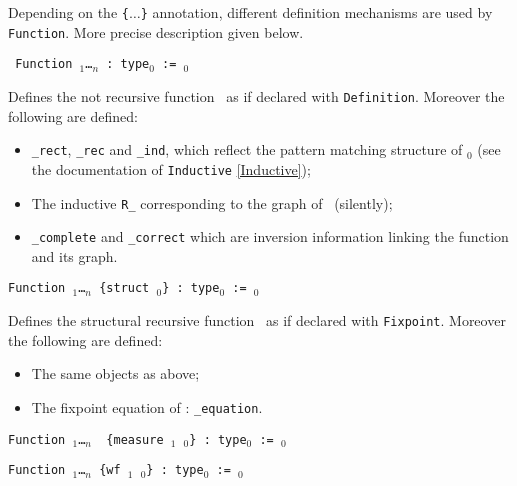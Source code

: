 \SeeAlso{\ref{FunScheme}, \ref{FunScheme-examples}, \ref{FunInduction}}

Depending on the {\tt \{$\ldots$\}} annotation, different definition
mechanisms are used by {\tt Function}. More precise description
given below.

\begin{Variants}
\item \texttt{ Function {\ident} {\binder$_1$}\ldots{\binder$_n$}
    : type$_0$ := \term$_0$}

  Defines the not recursive function \ident\ as if declared with
  \texttt{Definition}.  Moreover the following are defined:

  \begin{itemize}
  \item {\tt\ident\_rect}, {\tt\ident\_rec} and {\tt\ident\_ind},
    which reflect the pattern matching structure of \term$_0$ (see the
    documentation of {\tt Inductive} \ref{Inductive});
  \item The inductive \texttt{R\_\ident} corresponding to the graph of
    \ident\ (silently);
  \item \texttt{\ident\_complete} and \texttt{\ident\_correct} which are
    inversion information linking the function and its graph.
  \end{itemize}
\item \texttt{Function {\ident} {\binder$_1$}\ldots{\binder$_n$}
    {\tt \{}{\tt struct} \ident$_0${\tt\}} : type$_0$ := \term$_0$}
  
  Defines the structural recursive function \ident\ as if declared
  with \texttt{Fixpoint}.  Moreover the following are defined:

  \begin{itemize}
  \item The same objects as above;
  \item The fixpoint equation of \ident: \texttt{\ident\_equation}.
  \end{itemize}
  
\item \texttt{Function {\ident} {\binder$_1$}\ldots{\binder$_n$} {\tt
      \{}{\tt measure \term$_1$} \ident$_0${\tt\}} : type$_0$ :=
    \term$_0$}
\item \texttt{Function {\ident} {\binder$_1$}\ldots{\binder$_n$}
 {\tt \{}{\tt wf \term$_1$} \ident$_0${\tt\}} : type$_0$ := \term$_0$}


\end{Variants}
